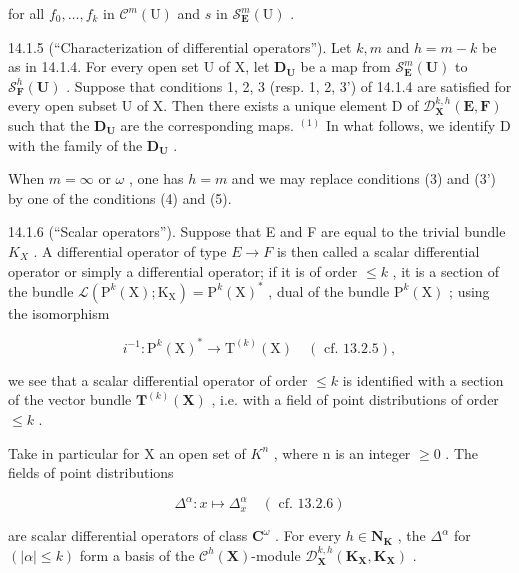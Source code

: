 for all \(f_{0},\ldots,f_{k}\) in \(\mathcal{C}^{m}(\mathrm{U})\) and \(s\) in \(\mathcal{S}_{\mathbf{E}}^{m}(\mathrm{U})\) .

14.1.5 (“Characterization of differential operators”). Let \(k, m\) and \(h = m - k\) be as in 14.1.4. For every open set U of X, let \(\mathbf{D}_{\mathbf{U}}\) be a map from \(\mathcal{S}_{\mathbf{E}}^{m}(\mathbf{U})\) to \(\mathcal{S}_{\mathbf{F}}^{h}(\mathbf{U})\) . Suppose that conditions 1, 2, 3 (resp. 1, 2, 3') of 14.1.4 are satisfied for every open subset U of X. Then there exists a unique element D of \(\mathcal{D}_{\mathbf{X}}^{k,h}(\mathbf{E},\mathbf{F})\) such that the \(\mathbf{D}_{\mathbf{U}}\) are the corresponding maps. \(^{(1)}\) In what follows, we identify D with the family of the \(\mathbf{D}_{\mathbf{U}}\) .

When \(m = \infty\) or \(\omega\) , one has \(h = m\) and we may replace conditions (3) and (3') by one of the conditions (4) and (5).

14.1.6 (“Scalar operators”). Suppose that E and F are equal to the trivial bundle \(K_{X}\) . A differential operator of type \(E \rightarrow F\) is then called a scalar differential operator or simply a differential operator; if it is of order \(\leqslant k\) , it is a section of the bundle \(\mathcal{L}(\mathrm{P}^{k}(\mathrm{X}); \mathrm{K}_{\mathrm{X}}) = \mathrm{P}^{k}(\mathrm{X})^{*}\) , dual of the bundle \(\mathrm{P}^{k}(\mathrm{X})\) ; using the isomorphism

\[
i ^ {- 1} \colon \mathrm{P} ^ {k} (\mathrm{X}) ^ {*} \rightarrow \mathrm{T} ^ {(k)} (\mathrm{X}) \quad (\text { cf. } 13.2.5),
\]

we see that a scalar differential operator of order \(\leqslant k\) is identified with a section of the vector bundle \(\mathbf{T}^{(k)}(\mathbf{X})\) , i.e. with a field of point distributions of order \(\leqslant k\) .

Take in particular for X an open set of \(K^{n}\) , where n is an integer \(\geqslant0\) . The fields of point distributions

\[
\Delta^ {\alpha} \colon x \mapsto \Delta_ {x} ^ {\alpha} \quad (\text { cf. } 1 3. 2. 6)
\]

are scalar differential operators of class \(\mathbf{C}^{\omega}\) . For every \(h\in\mathbf{N}_{\mathbf{K}}\) , the \(\Delta^{\alpha}\) for \((|\alpha|\leqslant k)\) form a basis of the \(\mathcal{C}^{h}(\mathbf{X})\)-module \(\mathcal{D}_{\mathbf{X}}^{k,h}(\mathbf{K}_{\mathbf{X}},\mathbf{K}_{\mathbf{X}})\) .

